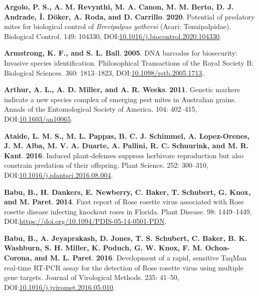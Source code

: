 \documentclass[12pt,final,CPage]{ufthesis}
\newlength{\cslhangindent}
\newenvironment{CSLReferences}[2] %
{%
	\setlength{\parindent}{0pt}
	\ifodd #1 \everypar{\setlength{\hangindent}{\cslhangindent}}\ignorespaces\fi
	\ifnum #2 > 0
	\setlength{\parskip}{#2\baselineskip}
	\fi
}%
{}
\begin{document}
{\begin{CSLReferences}{1}{0}
  \leavevmode{}%
  \textbf{Argolo, P. S., A. M. Revynthi, M. A. Canon, M. M. Berto, D. J. Andrade, İ. Döker, A. Roda, and D. Carrillo}. \textbf{2020}. Potential of predatory mites for biological control of {\emph{Brevipalpus yothersi}} ({Acari}: {Tenuipalpidae}). Biological Control. 149: 104330, DOI:\href{https://doi.org/10.1016/j.biocontrol.2020.104330}{10.1016/j.biocontrol.2020.104330}.

  \leavevmode{}%
  \textbf{Armstrong, K. F., and S. L. Ball}. \textbf{2005}. {DNA} barcodes for biosecurity: Invasive species identification. Philosophical Transactions of the Royal Society B: Biological Sciences. 360: 1813--1823, DOI:\href{https://doi.org/10.1098/rstb.2005.1713}{10.1098/rstb.2005.1713}.

  \leavevmode{}%
  \textbf{Arthur, A. L., A. D. Miller, and A. R. Weeks}. \textbf{2011}. Genetic markers indicate a new species complex of emerging pest mites in {Australian} grains. Annals of the Entomological Society of America. 104: 402--415, DOI:\href{https://doi.org/10.1603/an10065}{10.1603/an10065}.

  \leavevmode{}%
  \textbf{Ataide, L. M. S., M. L. Pappas, B. C. J. Schimmel, A. Lopez-Orenes, J. M. Alba, M. V. A. Duarte, A. Pallini, R. C. Schuurink, and M. R. Kant}. \textbf{2016}. Induced plant-defenses suppress herbivore reproduction but also constrain predation of their offspring. Plant Science. 252: 300--310, DOI:\href{https://doi.org/10.1016/j.plantsci.2016.08.004}{10.1016/j.plantsci.2016.08.004}.

  \leavevmode{}%
  \textbf{Babu, B., H. Dankers, E. Newberry, C. Baker, T. Schubert, G. Knox, and M. Paret}. \textbf{2014}. First report of {Rose rosette virus} associated with {Rose rosette disease} infecting knockout roses in {Florida}. Plant Disease. 98: 1449--1449, DOI:\url{https://doi.org/10.1094/PDIS-05-14-0501-PDN}.

  \leavevmode{}%
  \textbf{Babu, B., A. Jeyaprakash, D. Jones, T. S. Schubert, C. Baker, B. K. Washburn, S. H. Miller, K. Poduch, G. W. Knox, F. M. Ochoa-Corona, and M. L. Paret}. \textbf{2016}. Development of a rapid, sensitive {TaqMan} real-time {RT}-{PCR} assay for the detection of {Rose rosette virus} using multiple gene targets. Journal of Virological Methods. 235: 41--50, DOI:\href{https://doi.org/10.1016/j.jviromet.2016.05.010}{10.1016/j.jviromet.2016.05.010}.


\end{CSLReferences}}
\end{document}
